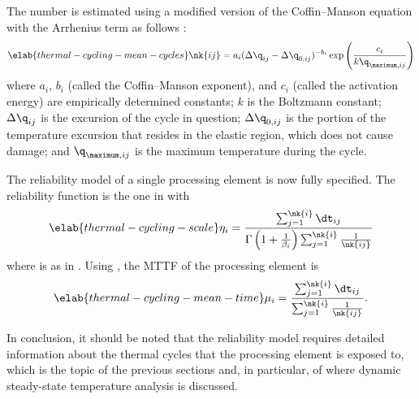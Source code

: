 The number  is estimated using a modified version of the Coffin--Manson
equation with the Arrhenius term as follows \cite{xiang2010, jedec2016}:
\begin{equation} \elab{thermal-cycling-mean-cycles}
  \nk{ij} = a_i (\Delta \q_{ij} - \Delta \q_{0, ij})^{-b_i} \exp\left(\frac{c_i}{k \q_{\maximum, ij}}\right)
\end{equation}
where $a_i$, $b_i$ (called the Coffin--Manson exponent), and $c_i$ (called the
activation energy) are empirically determined constants; $k$ is the Boltzmann
constant; $\Delta \q_{ij}$ is the excursion of the cycle in question; $\Delta
\q_{0, ij}$ is the portion of the temperature excursion that resides in the
elastic region, which does not cause damage; and $\q_{\maximum, ij}$ is the
maximum temperature during the cycle.

The reliability model of a single processing element is now fully specified. The
reliability function is the one in  with
\begin{equation} \elab{thermal-cycling-scale}
  \scale_i = \frac{\sum_{j = 1}^{\nk{i}} \dt_{ij}}{\Gamma\left(1 + \frac{1}{\shape_i}\right) \sum_{j = 1}^{\nk{i}} \frac{1}{\nk{ij}}}
\end{equation}
where  is as in . Using
, the \ac{MTTF} of the processing element is
\begin{equation} \elab{thermal-cycling-mean-time}
  \mean_i = \frac{\sum_{j = 1}^{\nk{i}} \dt_{ij}}{\sum_{j = 1}^{\nk{i}} \frac{1}{\nk{ij}}}.
\end{equation}

In conclusion, it should be noted that the reliability model requires detailed
information about the thermal cycles that the processing element is exposed to,
which is the topic of the previous sections and, in particular, of
 where dynamic steady-state temperature analysis is
discussed.
